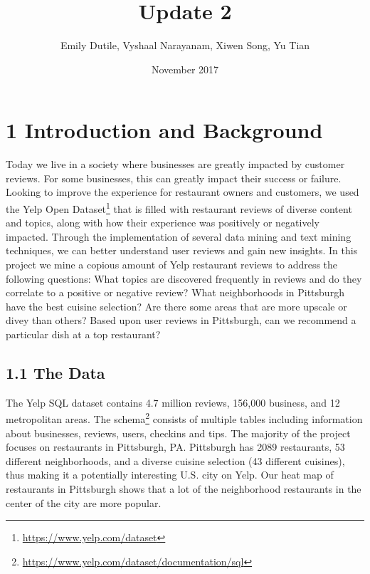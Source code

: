 \documentclass{neu_handout}
\title{Update 2}
\author{Emily Dutile, Vyshaal Narayanam, Xiwen Song, Yu Tian}
\date{November 2017}
\begin{document}
\section*{1 Introduction and Background}
Today we live in a society where businesses are greatly impacted by customer reviews. For some businesses, this can greatly impact their success or failure. Looking to improve the
experience for restaurant owners and customers, we used the Yelp Open Dataset\footnote{\url{https://www.yelp.com/dataset}} that is filled with restaurant reviews of diverse content and topics, along with how their experience was positively or negatively impacted. Through the implementation of several data mining and text mining techniques, we can better understand user reviews and gain new insights. In this project we mine a copious amount of Yelp restaurant reviews to address the following questions: What topics are discovered frequently in reviews and do they correlate to a positive or negative review? What neighborhoods in Pittsburgh have the best cuisine selection? Are there some areas that are more upscale or divey than others? Based upon user reviews in Pittsburgh, can we recommend a particular dish at a top restaurant?

\subsection*{1.1 The Data}
The Yelp SQL dataset contains 4.7 million reviews, 156,000 business, and 12 metropolitan areas. The schema\footnote{\url{https://www.yelp.com/dataset/documentation/sql}} consists of multiple tables including information about businesses, reviews, users, checkins and tips. The majority of the project focuses on restaurants in Pittsburgh, PA. Pittsburgh has 2089 restaurants, 53 different neighborhoods, and a diverse cuisine selection (43 different cuisines), thus making it a potentially interesting U.S. city on Yelp. Our heat map of restaurants in Pittsburgh shows that a lot of the neighborhood restaurants in the center of the city are more popular.
\end{document}
